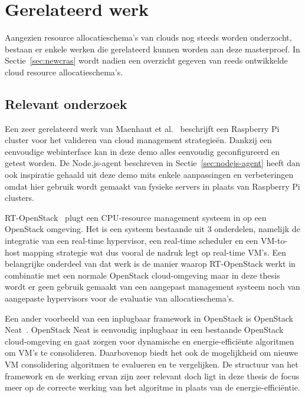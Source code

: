 \chapter{Gerelateerd werk}
\label{chap:rel_work}

Aangezien resource allocatieschema's van clouds nog steeds worden onderzocht, bestaan er enkele werken die gerelateerd kunnen worden aan deze masterproef. In Sectie~\ref{sec:newcras} wordt nadien een overzicht gegeven van reeds ontwikkelde cloud resource allocatieschema's.

\section{Relevant onderzoek}
\label{sec:related_work}

Een zeer gerelateerd werk van Maenhaut et al.~\cite{Maenhaut2017} beschrijft een Raspberry Pi cluster voor het valideren van cloud management strategieën. Dankzij een eenvoudige webinterface kan in deze demo alles eenvoudig geconfigureerd en getest worden. De Node.js-agent beschreven in Sectie~\ref{sec:nodejs-agent} heeft dan ook inspiratie gehaald uit deze demo mits enkele aanpassingen en verbeteringen omdat hier gebruik wordt gemaakt van fysieke servers in plaats van Raspberry Pi clusters.

RT-OpenStack~\cite{Xi2015} plugt een CPU-resource management systeem in op een OpenStack omgeving. Het is een systeem bestaande uit 3 onderdelen, namelijk de integratie van een real-time hypervisor, een real-time scheduler en een VM-to-host mapping strategie wat dus vooral de nadruk legt op real-time VM's. Een belangrijke onderdeel van dat werk is de manier waarop RT-OpenStack werkt in combinatie met een normale OpenStack cloud-omgeving maar in deze thesis wordt er geen gebruik gemaakt van een aangepast management systeem noch van aangepaste hypervisors voor de evaluatie van allocatieschema's.

Een ander voorbeeld van een inplugbaar framework in OpenStack is OpenStack Neat~\cite{Beloglazov2014}.  OpenStack Neat is eenvoudig inplugbaar in een bestaande OpenStack cloud-omgeving en gaat zorgen voor dynamische en energie-efficiënte algoritmen om VM's te consolideren. Daarbovenop biedt het ook de mogelijkheid om nieuwe VM consolidering algoritmen te evalueren en te vergelijken. De structuur van het framework en de werking ervan zijn zeer relevant doch ligt in deze thesis de focus meer op de correcte werking van het algoritme in plaats van de energie-efficiëntie.


